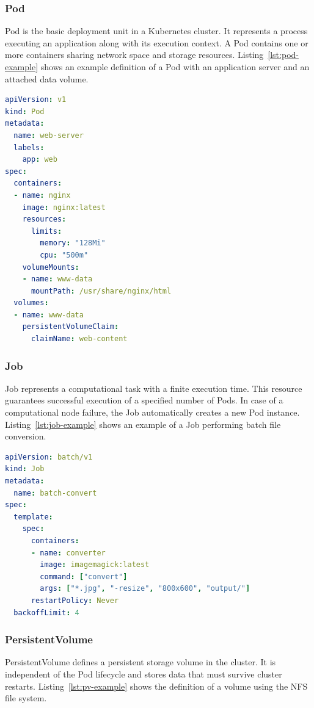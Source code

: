 \subsubsection{Pod}
Pod is the basic deployment unit in a Kubernetes cluster.
It represents a process executing an application along with its execution context.
A Pod contains one or more containers sharing network space and storage resources.
Listing~\ref{lst:pod-example} shows an example definition of a Pod with an application server and an attached data volume.

\begin{lstlisting}[language=yaml,caption={Example Pod definition},label={lst:pod-example}]
apiVersion: v1
kind: Pod
metadata:
  name: web-server
  labels:
    app: web
spec:
  containers:
  - name: nginx
    image: nginx:latest
    resources:
      limits:
        memory: "128Mi"
        cpu: "500m"
    volumeMounts:
    - name: www-data
      mountPath: /usr/share/nginx/html
  volumes:
  - name: www-data
    persistentVolumeClaim:
      claimName: web-content
\end{lstlisting}

\subsubsection{Job}
Job represents a computational task with a finite execution time.
This resource guarantees successful execution of a specified number of Pods.
In case of a computational node failure, the Job automatically creates a new Pod instance.
Listing~\ref{lst:job-example} shows an example of a Job performing batch file conversion.

\begin{lstlisting}[language=yaml,caption={Example Job definition},label={lst:job-example}]
apiVersion: batch/v1
kind: Job
metadata:
  name: batch-convert
spec:
  template:
    spec:
      containers:
      - name: converter
        image: imagemagick:latest
        command: ["convert"]
        args: ["*.jpg", "-resize", "800x600", "output/"]
      restartPolicy: Never
  backoffLimit: 4
\end{lstlisting}

\subsubsection{PersistentVolume}
PersistentVolume defines a persistent storage volume in the cluster.
It is independent of the Pod lifecycle and stores data that must survive cluster restarts.
Listing~\ref{lst:pv-example} shows the definition of a volume using the NFS file system.

